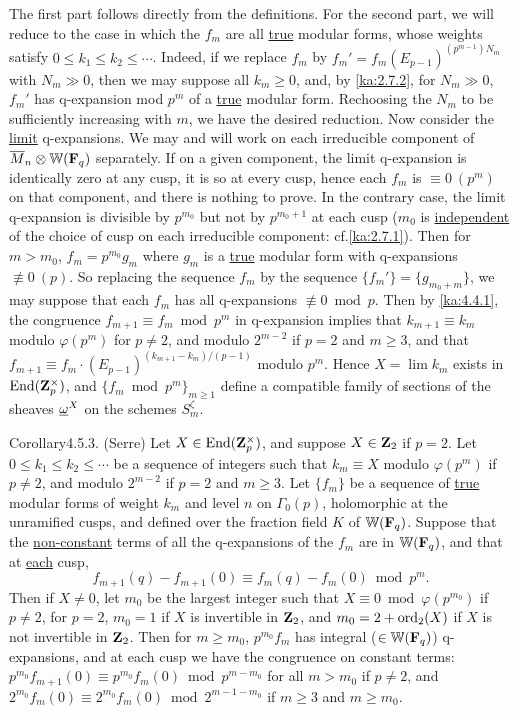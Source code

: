 \begin{kaproof}
The first part follows directly from the definitions. For the second part, we
will reduce to the case in which the $f_m$ are all \uline{true} modular forms,
whose weights satisfy $0\leq k_1\leq k_2\leq\cdots$. Indeed, if we replace $f_m$
by $f_m'=f_m(E_{p-1})^{(p^{m-1})N_m}$ with $N_m\gg 0$, then we may suppose all
$k_m\geq 0$, and, by \eqref{ka:2.7.2}, for $N_m\gg 0$, $f_m'$ has q-expansion mod $p^m$ of
a \uline{true} modular form. Rechoosing the $N_m$ to be sufficiently increasing
with $m$, we have the desired reduction. Now consider the \uline{limit}
q-expansions. We may and will work on each irreducible component of
$\overline{M}_n\otimes\mathbb{W}(\mathbf{F}_q)$ separately. If on a given component, the limit q-expansion
is identically zero at any cusp, it is so at every cusp, hence each $f_m$ is
$\equiv 0\ (p^m)$ on that component, and there is nothing to prove. In the
contrary case, the limit q-expansion is divisible by $p^{m_0}$ but not by
$p^{m_0+1}$ at each cusp ($m_0$ is \uline{independent} of the choice of cusp on
each irreducible component: cf.\eqref{ka:2.7.1}). Then for $m>m_0$, $f_m=p^{m_0}g_m$ where
$g_m$ is a \uline{true} modular form with q-expansions $\not\equiv 0\ (p)$. So
replacing the sequence $f_m$ by the sequence $\{f_m'\}=\{g_{m_0+m}\}$, we may
suppose that each $f_m$ has all q-expansions $\not\equiv 0 \bmod p$. Then by
\eqref{ka:4.4.1}, the congruence $f_{m+1}\equiv f_m \bmod p^m$ in q-expansion implies
that $k_{m+1}\equiv k_m$ modulo $\varphi(p^m)$ for $p\neq 2$, and modulo
$2^{m-2}$ if $p=2$ and $m\geq 3$, and that
$f_{m+1}\equiv f_m\cdot(E_{p-1})^{(k_{m+1}-k_m)/(p-1)}$ modulo $p^m$. Hence
$X=\lim k_m$ exists in $\operatorname{End}(\mathbf{Z}_p^\times)$, and
$\{f_m \bmod p^m\}_{m\geq 1}$ define a compatible family of sections of the
sheaves $\underline{\omega}^X$ on the schemes $S_m^\zeta$.
\end{kaproof}

\begin{kathm}{Corollary}{4.5.3.}
(Serre) Let $X\in\operatorname{End}(\mathbf{Z}_p^\times)$, and suppose $X\in\mathbf{Z}_2$ if $p=2$. Let
$0\leq k_1\leq k_2\leq\cdots$ be a sequence of integers such that $k_m\equiv X$
modulo $\varphi(p^m)$ if $p\neq 2$, and modulo $2^{m-2}$ if $p=2$ and $m\geq 3$.
Let $\{f_m\}$ be a sequence of \uline{true} modular forms of weight $k_m$ and
level $n$ on $\Gamma_0(p)$, holomorphic at the unramified cusps, and defined over
the fraction field $K$ of $\mathbb{W}(\mathbf{F}_q)$. Suppose that the \uline{non-constant}
terms of all the q-expansions of the $f_m$ are in $\mathbb{W}(\mathbf{F}_q)$, and that at
\uline{each} cusp,
\[
f_{m+1}(q)-f_{m+1}(0) \equiv f_m(q)-f_m(0) \bmod p^m .
\]
Then if $X\neq 0$, let $m_0$ be the largest integer such that
$X\equiv 0 \bmod \varphi(p^{m_0})$ if $p\neq 2$, for $p=2$, $m_0=1$ if $X$ is
invertible in $\mathbf{Z}_2$, and $m_0=2+\operatorname{ord}_2(X)$ if $X$ is not invertible in $\mathbf{Z}_2$.
Then for $m\geq m_0$, $p^{m_0}f_m$ has integral ($\in\mathbb{W}(\mathbf{F}_q)$) q-expansions, and
at each cusp we have the congruence on constant terms:
$p^{m_0}f_{m+1}(0)\equiv p^{m_0}f_m(0) \bmod p^{m-m_0}$ for all $m>m_0$ if
$p\neq 2$, and $2^{m_0}f_m(0)\equiv 2^{m_0}f_m(0) \bmod 2^{m-1-m_0}$ if $m\geq 3$
and $m\geq m_0$.
\end{kathm}


